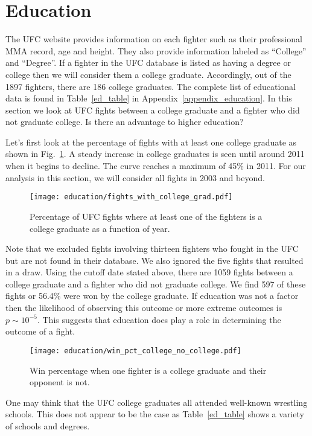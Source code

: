\clearpage
\section{Education}

The UFC website provides information on each fighter such
as their professional MMA record, age and height. They also provide
information labeled as ``College'' and ``Degree''. If a fighter in the
UFC database is listed as having a degree
or college then we will consider them a college graduate.
Accordingly, out of the 1897 fighters, there are 186 college graduates.
The complete list of educational data is found in Table~\ref{ed_table}
in Appendix~\ref{appendix_education}.
In this section we look at UFC fights between a college graduate
and a fighter who did not graduate college. Is there an advantage
to higher education?

Let's first look at the percentage of fights with at least
one college graduate as shown in Fig.~\ref{fights_with_college_grad}.
A steady increase in
college graduates is seen until around 2011 when it begins to decline.
The curve reaches a maximum of 45\% in 2011. For our analysis in this
section, we will consider all fights in 2003 and beyond.

\begin{figure}[h]
\begin{center}
\texttt{[image: education/fights\_with\_college\_grad.pdf]}
\caption{Percentage of UFC fights where at least one of the fighters
is a college graduate as a function of year.}
\label{fights_with_college_grad}
\end{center}
\end{figure}

Note that we excluded fights involving thirteen fighters who fought in the UFC
but are
not found in their database. We also ignored the five fights that resulted
in a draw.
Using the cutoff date stated above, there are 1059 fights between a college
graduate and a fighter who did not graduate college. We find
597 of these fights or 56.4\% were won by the college graduate.
If education was not a factor then the likelihood of observing
this outcome or more extreme outcomes is $p\sim10^{-5}$. This
suggests that education does play a role in determining the outcome
of a fight.

\begin{figure}[h]
\begin{center}
\texttt{[image: education/win\_pct\_college\_no\_college.pdf]}
\caption{Win percentage when one fighter is a college graduate and their
opponent is not.}
\label{win_pct_college_no_college}
\end{center}
\end{figure}

One may think that the UFC college graduates all attended well-known wrestling
schools. This does not appear to be the case as Table~\ref{ed_table} shows
a variety of schools and degrees.
